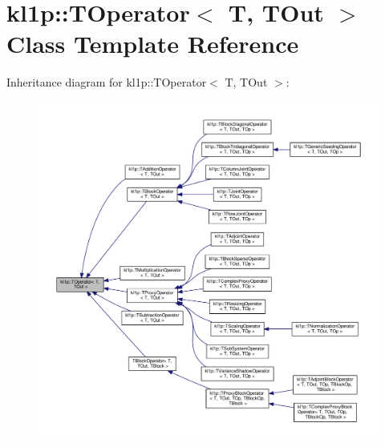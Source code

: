 \hypertarget{classkl1p_1_1TOperator}{}\section{kl1p\+:\+:T\+Operator$<$ T, T\+Out $>$ Class Template Reference}
\label{classkl1p_1_1TOperator}


Inheritance diagram for kl1p\+:\+:T\+Operator$<$ T, T\+Out $>$\+:
\nopagebreak
\begin{figure}[H]
\begin{center}
\leavevmode
\includegraphics[width=350pt]{classkl1p_1_1TOperator__inherit__graph}
\end{center}
\end{figure}

